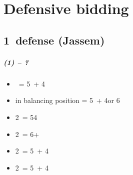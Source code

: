 \documentclass[12pt, a4paper]{report}
\begin{document}
\part*{\colorbox{RoyalPurple!30}{Defensive bidding}}
 {
    



    \chapter*{\colorbox{Plum!30}{1\ntx\ defense (Jassem)}}
     {
        \subsubsection*{(1\ntx) -- ?}
        \begin{itemize}
            \item \dbl\ = 5\minor\ + 4\major
            \item \dbl in balancing position = 5\minor\ + 4\major or 6\minor
            \item 2\clubs\ = 54 \major
            \item 2\diams\ = 6+ \major
            \item 2\hearts\ = 5\hearts\ + 4\minor
            \item 2\spades\ = 5\spades\ + 4\minor
        \end{itemize}

}}
\end{document}
